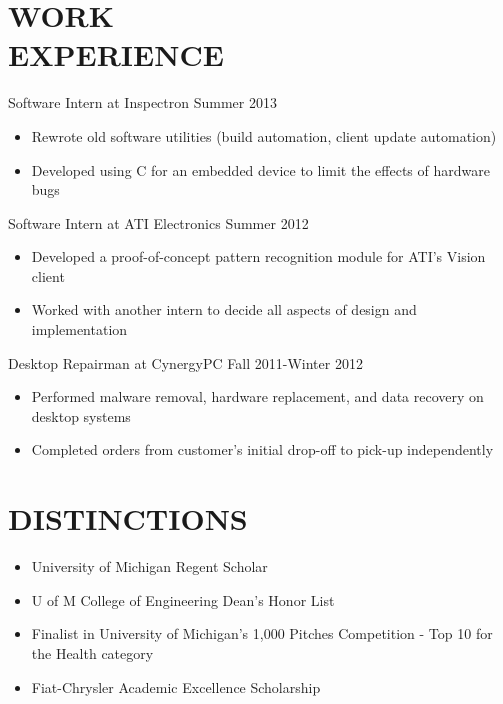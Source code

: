 \documentclass[line,margin]{res}
\begin{document}
\begin{resume}
\section{WORK \\ EXPERIENCE} {\sc Software Intern at Inspectron} \hfill Summer 2013 \\
                 \begin{itemize}  \itemsep -2pt %
                 \item Rewrote old software utilities (build automation, client update automation)
                \item   Developed using C for an embedded device to limit the effects of hardware bugs
                \end{itemize}
 
                {\sc Software Intern at ATI Electronics} \hfill            Summer 2012 \\
                 \begin{itemize}  \itemsep -2pt %
                 \item Developed a proof-of-concept pattern recognition module for ATI’s Vision client
                 \item Worked with another intern to decide all aspects of design and implementation
                 \end{itemize} 
                {\sc Desktop Repairman at CynergyPC} \hfill        Fall 2011-Winter 2012 \\
                  \begin{itemize}
                   \item Performed malware removal, hardware replacement, and data recovery on desktop systems
                   \item Completed orders from customer’s initial drop-off to pick-up independently 
                   \end{itemize} 

\section{DISTINCTIONS}
    \begin{itemize}
    \item University of Michigan Regent Scholar
    \item U of M College of Engineering Dean’s Honor List
    \item Finalist in University of Michigan’s 1,000 Pitches Competition - Top 10 for the Health category
    \item Fiat-Chrysler Academic Excellence Scholarship
    \end{itemize}
 

\end{resume}
\end{document}
